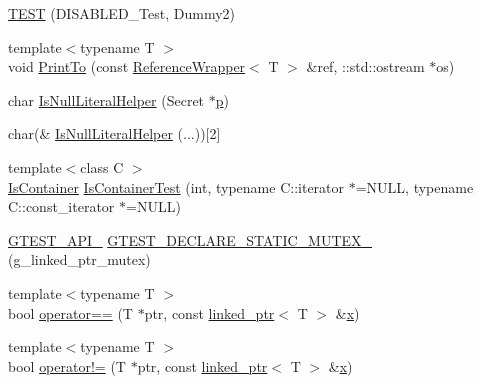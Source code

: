 \begin{DoxyCompactItemize}
\mbox{\hyperlink{namespacetesting_1_1internal_a4a84433419426d1c1b87ce998267b0d4}{T\+E\+ST}} (D\+I\+S\+A\+B\+L\+E\+D\+\_\+\+Test, Dummy2)
\item 
{\footnotesize template$<$typename T $>$ }\\void \mbox{\hyperlink{namespacetesting_1_1internal_a8fd10cc30084c36a89c74868c8bd53f8}{Print\+To}} (const \mbox{\hyperlink{classtesting_1_1internal_1_1_reference_wrapper}{Reference\+Wrapper}}$<$ T $>$ \&ref, \+::std\+::ostream $\ast$os)
\item 
char \mbox{\hyperlink{namespacetesting_1_1internal_afb0731ba39ffef1fa1730ac0699c9025}{Is\+Null\+Literal\+Helper}} (Secret $\ast$\mbox{\hyperlink{_obj__test_2lib_2googletest-master_2googlemock_2test_2gmock-matchers__test_8cc_a6bc6b007533335efe02bafff799ec64c}{p}})
\item 
char(\& \mbox{\hyperlink{namespacetesting_1_1internal_ab53ecfa1632a871ce7c692d722a75a57}{Is\+Null\+Literal\+Helper}} (...))\mbox{[}2\mbox{]}
\item 
{\footnotesize template$<$class C $>$ }\\\mbox{\hyperlink{namespacetesting_1_1internal_ad8f0c2883245f1df2a53618a49f0deb3}{Is\+Container}} \mbox{\hyperlink{namespacetesting_1_1internal_acb6ea1086293c1d6636e3c67941351fb}{Is\+Container\+Test}} (int, typename C\+::iterator $\ast$=N\+U\+LL, typename C\+::const\+\_\+iterator $\ast$=N\+U\+LL)
\item 
\mbox{\hyperlink{_obj__test_2lib_2googletest-release-1_88_81_2googletest_2include_2gtest_2internal_2gtest-port_8h_aa73be6f0ba4a7456180a94904ce17790}{G\+T\+E\+S\+T\+\_\+\+A\+P\+I\+\_\+}} \mbox{\hyperlink{namespacetesting_1_1internal_ad7c5625384cf5f6b714188f274537ef6}{G\+T\+E\+S\+T\+\_\+\+D\+E\+C\+L\+A\+R\+E\+\_\+\+S\+T\+A\+T\+I\+C\+\_\+\+M\+U\+T\+E\+X\+\_\+}} (g\+\_\+linked\+\_\+ptr\+\_\+mutex)
\item 
{\footnotesize template$<$typename T $>$ }\\bool \mbox{\hyperlink{namespacetesting_1_1internal_ad1cb54a206a209ddace17a05359d38ae}{operator==}} (T $\ast$ptr, const \mbox{\hyperlink{classtesting_1_1internal_1_1linked__ptr}{linked\+\_\+ptr}}$<$ T $>$ \&\mbox{\hyperlink{_obj__test_2lib_2googletest-master_2googlemock_2test_2gmock-matchers__test_8cc_a6150e0515f7202e2fb518f7206ed97dc}{x}})
\item 
{\footnotesize template$<$typename T $>$ }\\bool \mbox{\hyperlink{namespacetesting_1_1internal_a6910869259f8f31825b471e9190fa09a}{operator!=}} (T $\ast$ptr, const \mbox{\hyperlink{classtesting_1_1internal_1_1linked__ptr}{linked\+\_\+ptr}}$<$ T $>$ \&\mbox{\hyperlink{_obj__test_2lib_2googletest-master_2googlemock_2test_2gmock-matchers__test_8cc_a6150e0515f7202e2fb518f7206ed97dc}{x}})

\end{DoxyCompactItemize}

